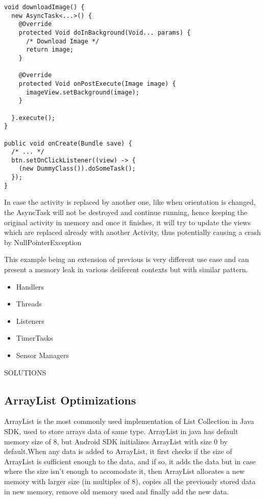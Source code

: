 \documentclass[journal]{IEEEtran}
\begin{document}
\begin{itemize}
	\newpage
\begin{verbatim}
void downloadImage() {
  new AsyncTask<...>() {
    @Override
    protected Void doInBackground(Void... params) {
      /* Download Image */
      return image;
    }
    
    @Override
    protected Void onPostExecute(Image image) {
      imageView.setBackground(image);
    }
    
  }.execute();
}

public void onCreate(Bundle save) {
  /* ... */
  btn.setOnClickListener((view) -> {
    (new DummyClass()).doSomeTask();
  });
}
\end{verbatim}
	In case the activity is replaced by another one, like when orientation is changed, the AsyncTask will not be destroyed and continue running, hence keeping the original activity in memory and once it finishes, it will try to update the views which are replaced already with another Activity, thus potentially causing a crash by NullPointerException
	
	This example being an extension of previous is very different use case and can present a memory leak in various deiiferent contexts but with similar pattern.
	\begin{itemize}
		\item Handlers
		\item Threads
		\item Listeners
		\item TimerTasks
		\item Sensor Managers\\
	\end{itemize}
	

\end{itemize}

\begin{center}
	SOLUTIONS
\end{center}

\subsection{ArrayList Optimizations}
ArrayList is the most commonly used implementation of List Collection in Java SDK, used to store arrays data of same type. ArrayList in java has default memory size of 8, but Android SDK initializes ArrayList with size 0 by default.When any data is added to ArrayList, it first checks if the size of ArrayList is sufficient enough to  the data, and if so, it adds the data but in case where the size isn't enough to accomodate it, then ArrayList allocates a new memory with larger size (in multiples of 8), copies all the previously stored data in new memory, remove old memory used and finally add the new data.
\end{document}
